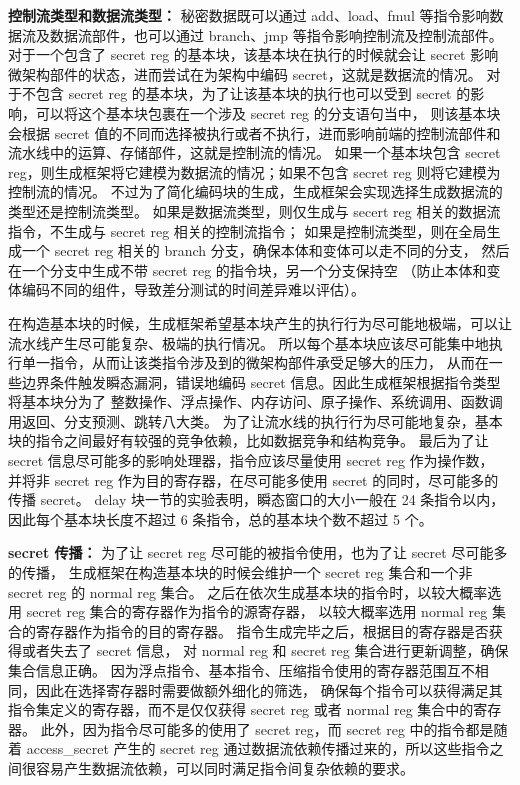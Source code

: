 \textbf{控制流类型和数据流类型：}
秘密数据既可以通过 add、load、fmul 等指令影响数据流及数据流部件，也可以通过 branch、jmp 等指令影响控制流及控制流部件。
对于一个包含了 secret reg 的基本块，该基本块在执行的时候就会让 secret 影响微架构部件的状态，进而尝试在为架构中编码 secret，这就是数据流的情况。
对于不包含 secret reg 的基本块，为了让该基本块的执行也可以受到 secret 的影响，可以将这个基本块包裹在一个涉及 secret reg 的分支语句当中，
则该基本块会根据 secret 值的不同而选择被执行或者不执行，进而影响前端的控制流部件和流水线中的运算、存储部件，这就是控制流的情况。
如果一个基本块包含 secret reg，则生成框架将它建模为数据流的情况；如果不包含 secret reg 则将它建模为控制流的情况。
不过为了简化编码块的生成，生成框架会实现选择生成数据流的类型还是控制流类型。
如果是数据流类型，则仅生成与 secert reg 相关的数据流指令，不生成与 secret reg 相关的控制流指令；
如果是控制流类型，则在全局生成一个 secret reg 相关的 branch 分支，确保本体和变体可以走不同的分支，
然后在一个分支中生成不带 secret reg 的指令块，另一个分支保持空
（防止本体和变体编码不同的组件，导致差分测试的时间差异难以评估）。\par

在构造基本块的时候，生成框架希望基本块产生的执行行为尽可能地极端，可以让流水线产生尽可能复杂、极端的执行情况。
所以每个基本块应该尽可能集中地执行单一指令，从而让该类指令涉及到的微架构部件承受足够大的压力，
从而在一些边界条件触发瞬态漏洞，错误地编码 secret 信息。因此生成框架根据指令类型将基本块分为了
整数操作、浮点操作、内存访问、原子操作、系统调用、函数调用返回、分支预测、跳转八大类。
为了让流水线的执行行为尽可能地复杂，基本块的指令之间最好有较强的竞争依赖，比如数据竞争和结构竞争。
最后为了让 secret 信息尽可能多的影响处理器，指令应该尽量使用 secret reg 作为操作数，
并将非 secret reg 作为目的寄存器，在尽可能多使用 secret 的同时，尽可能多的传播 secret。
delay 块一节的实验表明，瞬态窗口的大小一般在 24 条指令以内，
因此每个基本块长度不超过 6 条指令，总的基本块个数不超过 5 个。\par

\textbf{secret 传播：}
为了让 secret reg 尽可能的被指令使用，也为了让 secret 尽可能多的传播，
生成框架在构造基本块的时候会维护一个 secret reg 集合和一个非 secret reg 的 normal reg 集合。
之后在依次生成基本块的指令时，以较大概率选用 secret reg 集合的寄存器作为指令的源寄存器，
以较大概率选用 normal reg 集合的寄存器作为指令的目的寄存器。
指令生成完毕之后，根据目的寄存器是否获得或者失去了 secret 信息，
对 normal reg 和 secret reg 集合进行更新调整，确保集合信息正确。
因为浮点指令、基本指令、压缩指令使用的寄存器范围互不相同，因此在选择寄存器时需要做额外细化的筛选，
确保每个指令可以获得满足其指令集定义的寄存器，而不是仅仅获得 secret reg 或者 normal reg 集合中的寄存器。
此外，因为指令尽可能多的使用了 secret reg，而 secret reg 中的指令都是随着 access\_secret 产生的 secret reg
通过数据流依赖传播过来的，所以这些指令之间很容易产生数据流依赖，可以同时满足指令间复杂依赖的要求。\par

